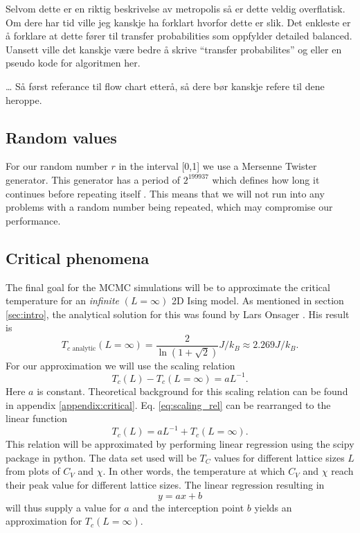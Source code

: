 \documentclass[english,notitlepage,reprint,nofootinbib]{revtex4-1}  %
\begin{document}
Selvom dette er en riktig beskrivelse av metropolis så er dette veldig overflatisk. Om dere har tid ville jeg kanskje ha forklart hvorfor dette er slik. Det enkleste er å forklare at dette fører til transfer probabilities som oppfylder detailed balanced. Uansett ville det kanskje være bedre å skrive “transfer probabilites” og eller en pseudo kode for algoritmen her.

… Så først referance til flow chart etterå, så dere bør kanskje refere til dene heroppe.
\subsection*{Random values}
For our random number $r$ in the interval [0,1] we use a Mersenne Twister generator. This generator has a period of $2^{199937}$ which defines how long it continues before repeating itself \cite{SHEMA201071}. This means that we will not run into any problems with a random number being repeated, which may compromise our performance.

\subsection*{Critical phenomena}
The final goal for the MCMC simulations will be to approximate the critical temperature for an \textit{infinite} $(L=\infty)$ 2D Ising model. As mentioned in section \ref{sec:intro}, the analytical solution for this was found by Lars Onsager \cite{project}. His result is
\begin{equation*}
    T_{c \text{ analytic}}(L=\infty) = \frac{2}{\ln(1+\sqrt{2})}J/k_B \approx 2.269 J/k_B.
\end{equation*}
For our approximation we will use the scaling relation
\begin{equation}
    T_c(L) -T_c(L=\infty) = aL^{-1}. \label{eq:scaling_rel}
\end{equation}
Here $a$ is constant. Theoretical background for this scaling relation can be found in appendix \ref{appendix:critical}. Eq. \ref{eq:scaling_rel} can be rearranged to the linear function
\begin{equation}
    T_c(L) = aL^{-1} + T_c(L=\infty). \label{eq:scaling_linear}
\end{equation}
This relation will be approximated by performing linear regression using the scipy package in python. The data set used will be $T_C$ values for different lattice sizes $L$ from plots of $C_V$ and $\chi$. In other words, the temperature at which $C_V$ and $\chi$ reach their peak value for different lattice sizes. The linear regression resulting in
\begin{equation}
    y = ax + b
\end{equation}
will thus supply a value for $a$ and the interception point $b$ yields an approximation for $T_c(L=\infty)$.
\end{document}
